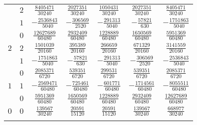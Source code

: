 \begin{table}
\begin{center}
\begin{tabular}{ccccccc}
           &  $2$  &  $ \frac{ 8405471}{30240}$  &  $ \frac{2027351}{30240}$  &  $ \frac{1050431}{30240}$  &  $ \frac{2027351}{30240}$  &  $ \frac{ 8405471}{30240}$  \\ \addlinespace
           &  $1$  &  $-\frac{ 2536843}{ 5040}$  &  $-\frac{ 306569}{ 2520}$  &  $-\frac{ 291313}{ 5040}$  &  $-\frac{  57821}{  630}$  &  $-\frac{ 1751863}{ 5040}$  \\ \addlinespace
           &  $0$  &  $ \frac{12627689}{60480}$  &  $ \frac{2932409}{60480}$  &  $ \frac{1228889}{60480}$  &  $ \frac{1650569}{60480}$  &  $ \frac{ 5951369}{60480}$  \\ \addlinespace
      $2$  &  $2$  &  $ \frac{ 1501039}{20160}$  &  $ \frac{ 395389}{20160}$  &  $ \frac{ 266659}{20160}$  &  $ \frac{ 671329}{20160}$  &  $ \frac{ 3141559}{20160}$  \\ \addlinespace
           &  $1$  &  $-\frac{ 1751863}{ 5040}$  &  $-\frac{  57821}{  630}$  &  $-\frac{ 291313}{ 5040}$  &  $-\frac{ 306569}{ 2520}$  &  $-\frac{ 2536843}{ 5040}$  \\ \addlinespace
           &  $0$  &  $ \frac{ 2085371}{ 6720}$  &  $ \frac{ 539351}{ 6720}$  &  $ \frac{ 299531}{ 6720}$  &  $ \frac{ 539351}{ 6720}$  &  $ \frac{ 2085371}{ 6720}$  \\ \addlinespace
      $1$  &  $1$  &  $-\frac{ 2569471}{60480}$  &  $-\frac{ 725461}{60480}$  &  $-\frac{ 601771}{60480}$  &  $-\frac{1714561}{60480}$  &  $-\frac{ 8055511}{60480}$  \\ \addlinespace
           &  $0$  &  $ \frac{ 5951369}{60480}$  &  $ \frac{1650569}{60480}$  &  $ \frac{1228889}{60480}$  &  $ \frac{2932409}{60480}$  &  $ \frac{12627689}{60480}$  \\ \addlinespace
      $0$  &  $0$  &  $ \frac{  139567}{30240}$  &  $ \frac{  20591}{15120}$  &  $ \frac{  20591}{15120}$  &  $ \frac{ 139567}{30240}$  &  $ \frac{  668977}{30240}$  \\ \addlinespace
      \bottomrule
    \end{tabular}
  \end{center}
\end{table}

